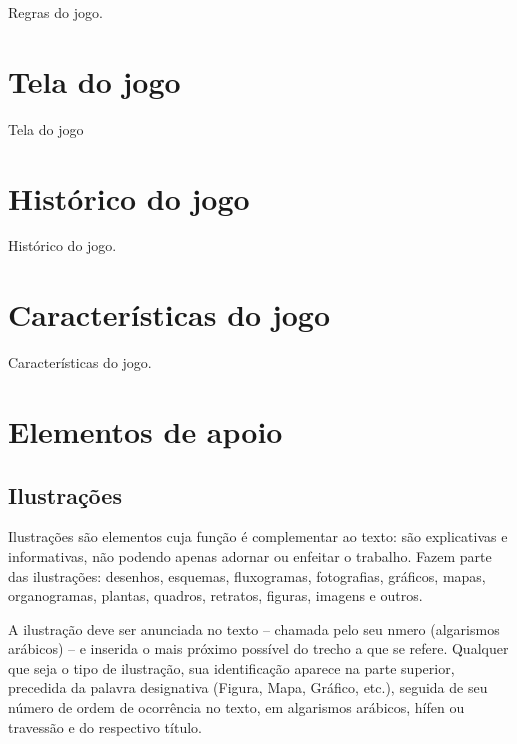 \documentclass[12pt,oneside,a4paper,chapter=TITLE,section=TITLE,sumario
=tradicional]{abntex2}
\begin{document}
Regras do jogo.

\chapter{Tela do jogo}
\label{cap:tela-do-jogo}

Tela do jogo

\chapter{Histórico do jogo}
\label{cap:historico-do-jogo}

Histórico do jogo.

\chapter{Características do jogo}
\label{cap:caracteristicas-do-jogo}

Características do jogo.

\chapter{Elementos de apoio}
\label{cap:apoio}

\section{Ilustrações}
\label{cap:ilustracoes}

Ilustrações são elementos cuja função é complementar ao texto: são explicativas 
e informativas, não podendo apenas adornar ou enfeitar o trabalho. Fazem parte 
das ilustrações: desenhos, esquemas, fluxogramas, fotografias, gráficos, mapas, 
organogramas, plantas, quadros, retratos, figuras, imagens e outros.

A ilustração deve ser anunciada no texto – chamada pelo seu nmero (algarismos 
arábicos) – e inserida o mais próximo possível do trecho a que se refere.
Qualquer que seja o tipo de ilustração, sua identificação aparece na parte 
superior, precedida da palavra designativa (Figura, Mapa, Gráfico, etc.), 
seguida de seu número de ordem de ocorrência no texto, em algarismos arábicos, 
hífen ou travessão e do respectivo título.
\end{document}
